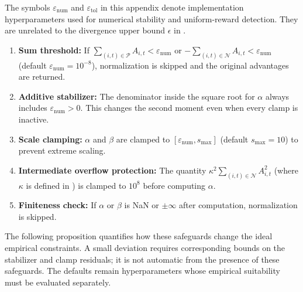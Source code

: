 \begin{remark}
The symbols $\varepsilon_{\mathrm{num}}$ and $\varepsilon_{\mathrm{tol}}$ in this appendix denote implementation hyperparameters used for
numerical stability and uniform-reward detection. They are unrelated to the divergence upper bound $\epsilon$ in .
\end{remark}

\begin{enumerate}
    \item \textbf{Sum threshold:} If $\sum_{(i,t)\in\mathcal{P}} A_{i,t} < \varepsilon_{\mathrm{num}}$ or
    $-\sum_{(i,t)\in\mathcal{N}} A_{i,t} < \varepsilon_{\mathrm{num}}$ (default $\varepsilon_{\mathrm{num}} = 10^{-8}$), normalization is
    skipped and the original advantages are returned.

    \item \textbf{Additive stabilizer:} The denominator inside the square root for $\alpha$ always includes
    $\varepsilon_{\mathrm{num}}>0$. This changes the second moment even when every clamp is inactive.

    \item \textbf{Scale clamping:} $\alpha$ and $\beta$ are clamped to $[\varepsilon_{\mathrm{num}}, s_{\max}]$ (default $s_{\max} = 10$) to prevent extreme scaling.

    \item \textbf{Intermediate overflow protection:} The quantity
    $\kappa^2 \sum_{(i,t)\in\mathcal{N}} A_{i,t}^2$ (where $\kappa$ is defined in ) is clamped to $10^8$ before
    computing $\alpha$.

    \item \textbf{Finiteness check:} If $\alpha$ or $\beta$ is NaN or $\pm\infty$ after computation, normalization is skipped.
\end{enumerate}

The following proposition quantifies how these safeguards change the ideal
empirical constraints. A small deviation requires corresponding bounds on
the stabilizer and clamp residuals; it is not automatic from the presence of
these safeguards. The defaults remain hyperparameters whose empirical
suitability must be evaluated separately.

